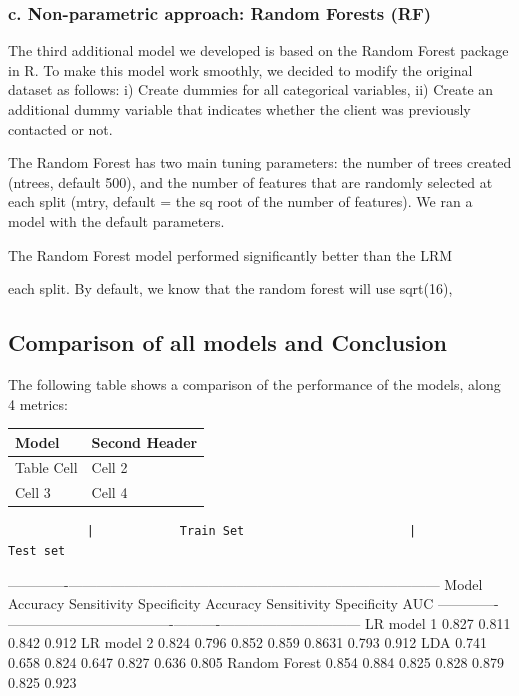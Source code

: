 \documentclass[]{article}
\begin{document}
\subsubsection{c. Non-parametric approach: Random Forests
(RF)}\label{c.-non-parametric-approach-random-forests-rf}

The third additional model we developed is based on the Random Forest
package in R. To make this model work smoothly, we decided to modify the
original dataset as follows: i) Create dummies for all categorical
variables, ii) Create an additional dummy variable that indicates
whether the client was previously contacted or not.

The Random Forest has two main tuning parameters: the number of trees
created (ntrees, default 500), and the number of features that are
randomly selected at each split (mtry, default = the sq root of the
number of features). We ran a model with the default parameters.

The Random Forest model performed significantly better than the LRM

each split. By default, we know that the random forest will use
sqrt(16),

\subsection{Comparison of all models and
Conclusion}\label{comparison-of-all-models-and-conclusion}

The following table shows a comparison of the performance of the models,
along 4 metrics:

\begin{longtable}[]{@{}ll@{}}
\toprule
Model & Second Header\tabularnewline
\midrule
\endhead
Table Cell & Cell 2\tabularnewline
Cell 3 & Cell 4\tabularnewline
\bottomrule
\end{longtable}

\begin{verbatim}
           |            Train Set                       |             Test set          
\end{verbatim}

-------------\textbar{}--------------------------------------\textbar{}------------------------------------\textbar{}------
Model \textbar{}Accuracy \textbar{} Sensitivity \textbar{} Specificity
\textbar{} Accuracy \textbar{}Sensitivity \textbar{}Specificity
\textbar{} AUC
-------------\textbar{}---------\textbar{}--------------\textbar{}-------------\textbar{}----------\textbar{}------------\textbar{}------------\textbar{}------
LR model 1 \textbar{} 0.827 \textbar{} 0.811 \textbar{} 0.842 \textbar{}
\textbar{} \textbar{} \textbar{} 0.912 LR model 2 \textbar{} 0.824
\textbar{} 0.796 \textbar{} 0.852 \textbar{} 0.859 \textbar{} 0.8631
\textbar{} 0.793 \textbar{} 0.912 LDA \textbar{} 0.741 \textbar{} 0.658
\textbar{} 0.824 \textbar{} 0.647 \textbar{} 0.827 \textbar{} 0.636
\textbar{} 0.805 Random Forest\textbar{} 0.854 \textbar{} 0.884
\textbar{} 0.825 \textbar{} 0.828 \textbar{} 0.879 \textbar{} 0.825
\textbar{} 0.923
\end{document}
